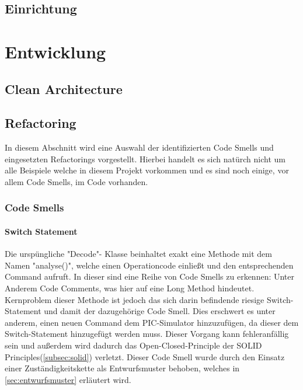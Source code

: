 \documentclass[12pt,a4paper,titlepage,ngerman,pdftex]{report}
\begin{document}
    \section{Einrichtung}\label{sec:einrichtung}

    \chapter{Entwicklung}\label{ch:entwicklung}
    \section{Clean Architecture}\label{sec:cleanarchitecture}
 
    \section{Refactoring}\label{sec:refactoring}

    In diesem Abschnitt wird eine Auswahl der identifizierten Code Smells und eingesetzten Refactorings vorgestellt. Hierbei handelt es sich natürch nicht um alle Beispiele welche in diesem Projekt vorkommen und es sind noch einige, vor allem Code Smells, im Code vorhanden. 

    \subsection{Code Smells}

    \subsubsection{Switch Statement}

    Die urspüngliche "Decode"- Klasse beinhaltet exakt eine Methode mit dem Namen "analyse()", welche einen Operationcode einließt und den entsprechenden Command aufruft. In dieser sind eine Reihe von Code Smells zu erkennen: Unter Anderem Code Comments, was hier auf eine Long Method hindeutet.
    Kernproblem dieser Methode ist jedoch das sich darin befindende riesige Switch-Statement und damit der dazugehörige Code Smell. Dies erschwert es unter anderem, einen neuen Command dem PIC-Simulator hinzuzufügen,
    da dieser dem Switch-Statement hinzugefügt werden muss. Dieser Vorgang kann fehleranfällig sein und außerdem wird dadurch das Open-Closed-Principle der SOLID Principles(\autoref{subsec:solid}) verletzt. 
    Dieser Code Smell wurde durch den Einsatz einer Zuständigkeitskette als Entwurfsmuster behoben, welches in \autoref{sec:entwurfsmuster} erläutert wird.
\end{document}
